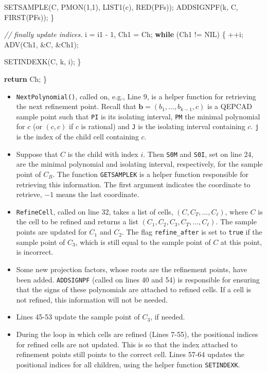 \documentclass[
]{book}
\newenvironment{Shaded}{\begin{snugshade}}{\end{snugshade}}
\newcommand{\CommentTok}[1]{\textcolor[rgb]{0.56,0.35,0.01}{\textit{#1}}}
\newcommand{\ControlFlowTok}[1]{\textcolor[rgb]{0.13,0.29,0.53}{\textbf{#1}}}
\newcommand{\DecValTok}[1]{\textcolor[rgb]{0.00,0.00,0.81}{#1}}
\newcommand{\NormalTok}[1]{#1}
\providecommand{\tightlist}{%
  \setlength{\itemsep}{0pt}\setlength{\parskip}{0pt}}
\theoremstyle{definition}
\theoremstyle{definition}
\theoremstyle{definition}
\theoremstyle{definition}
\theoremstyle{remark}
\begin{document}
\begin{Shaded}
\begin{Highlighting}[numbers=left,,]
\NormalTok{        SETSAMPLE(C, PMON(}\DecValTok{1}\NormalTok{,}\DecValTok{1}\NormalTok{), LIST1(c), RED(PFs));}
\NormalTok{        ADDSIGNPF(k, C, FIRST(PFs));}
\NormalTok{    \}}

    \CommentTok{// finally update indices.}
\NormalTok{    i = i1 {-} }\DecValTok{1}\NormalTok{, Ch1 = Ch;}
    \ControlFlowTok{while}\NormalTok{ (Ch1 != NIL) \{}
\NormalTok{        ++i;}
\NormalTok{        ADV(Ch1, \&C, \&Ch1);}

\NormalTok{        SETINDEXK(C, k, i);}
\NormalTok{    \}}

    \ControlFlowTok{return}\NormalTok{ Ch;}
\NormalTok{\}}
\end{Highlighting}
\end{Shaded}

\begin{itemize}
\tightlist
\item
  \texttt{NextPolynomial()}, called on, e.g., Line 9, is a helper function for retrieving the next refinement point.
  Recall that \(\mathbf{b} = (b_1,\ldots,b_{k-1},c)\) is a QEPCAD sample point such that \texttt{PI} is its isolating interval, \texttt{PM} the minimal polynomial for \(c\) (or \((c,c)\) if \(c\) is rational) and \texttt{J} is the isolating interval containing \(c\). \texttt{j} is the index of the child cell containing \(c\).
\item
  Suppose that \(C\) is the child with index \(i\). Then \texttt{S0M} and \texttt{S0I}, set on line 24, are the minimal polynomial and isolating interval, respectively, for the sample point of \(C_B\). The function \texttt{GETSAMPLEK} is a helper function responsible for retrieving this information. The first argument indicates the coordinate to retrieve, \(-1\) means the last coordinate.
\item
  \texttt{RefineCell}, called on line 32, takes a list of cells, \((C,C_T, \ldots,C_\ell)\), where \(C\) is the cell to be refined and returns a list \((C_1,C_2,C_3,C_T,\ldots,C_\ell)\). The sample points are updated for \(C_1\) and \(C_2\). The flag \texttt{refine\_after} is set to \texttt{true} if the sample point of \(C_3\), which is still equal to the sample point of \(C\) at this point, is incorrect.
\item
  Some new projection factors, whose roots are the refinement points, have been added. \texttt{ADDSIGNPF} (called on lines 40 and 54) is responsible for ensuring that the signs of these polynomials are attached to refined cells. If a cell is not refined, this information will not be needed.
\item
  Lines 45-53 update the sample point of \(C_3\), if needed.
\item
  During the loop in which cells are refined (Lines 7-55), the positional indices for refined cells are not updated. This is so that the index attached to refinement points still points to the correct cell. Lines 57-64 updates the positional indices for all children, using the helper function \texttt{SETINDEXK}.
\end{itemize}
\end{document}
